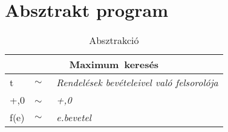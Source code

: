 \section{Absztrakt program}
\begin{table}[htb]
\caption{Absztrakció}
\label{tab:Abstraction}
\begin{center}
\begin{tabular}{|lll|}
	\hline
	\multicolumn{3}{|c|}{\textbf{Maximum~keresés}}\\
	\hline
	t & $\sim$ & \textit{Rendelések bevételeivel való felsorolója}\\
	+,0 & $\sim$~ & \textit{+,0}\\
	f(e) & $\sim$ & \textit{e.bevetel}\\
	\hline
\end{tabular}
\end{center}
\end{table}


